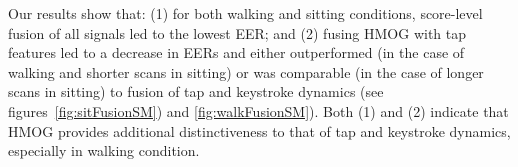 %


%


%

%
 
%



%
%
Our results show that: (1) for both walking and sitting conditions, score-level fusion of all signals led to the lowest EER; and (2) fusing HMOG with tap features led to a decrease in EERs and either outperformed (in the case of walking and shorter scans in sitting) or was comparable (in the case of longer scans in sitting) to fusion of tap and keystroke dynamics (see figures~\ref{fig:sitFusionSM}) and \ref{fig:walkFusionSM}). Both (1) and (2) indicate that HMOG provides additional distinctiveness to that of tap and keystroke dynamics, especially in walking condition.



